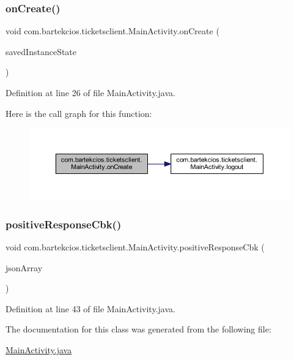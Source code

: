 \subsubsection{\texorpdfstring{on\+Create()}{onCreate()}}
{\footnotesize\ttfamily void com.\+bartekcios.\+ticketsclient.\+Main\+Activity.\+on\+Create (\begin{DoxyParamCaption}\item[{Bundle}]{saved\+Instance\+State }\end{DoxyParamCaption})\hspace{0.3cm}{\ttfamily [protected]}}



Definition at line 26 of file Main\+Activity.\+java.

Here is the call graph for this function\+:
\nopagebreak
\begin{figure}[H]
\begin{center}
\leavevmode
\includegraphics[width=350pt]{classcom_1_1bartekcios_1_1ticketsclient_1_1_main_activity_abb8da6abefdc5a7e1bb13d1b4e7909a1_cgraph}
\end{center}
\end{figure}
\mbox{\label{classcom_1_1bartekcios_1_1ticketsclient_1_1_main_activity_a0c44c46c29fb27debcc210af8b4c79f0}} 
\subsubsection{\texorpdfstring{positive\+Response\+Cbk()}{positiveResponseCbk()}}
{\footnotesize\ttfamily void com.\+bartekcios.\+ticketsclient.\+Main\+Activity.\+positive\+Response\+Cbk (\begin{DoxyParamCaption}\item[{J\+S\+O\+N\+Array}]{json\+Array }\end{DoxyParamCaption})}



Definition at line 43 of file Main\+Activity.\+java.



The documentation for this class was generated from the following file\+:\begin{DoxyCompactItemize}
\item 
\hyperlink{_main_activity_8java}{Main\+Activity.\+java}\end{DoxyCompactItemize}
